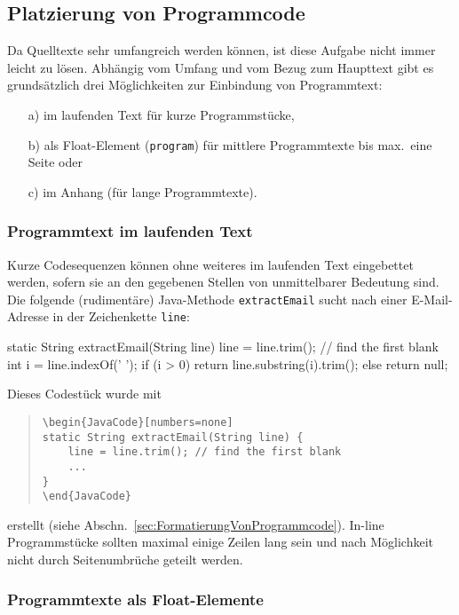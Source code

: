 \subsection{Platzierung von Programmcode}

Da Quelltexte sehr umfangreich werden können, ist diese Aufgabe nicht immer
leicht zu lösen. Abhängig vom Umfang und vom Bezug zum Haupttext gibt es
grundsätzlich drei Möglichkeiten zur Einbindung von Programmtext:
%
\begin{itemize}
	\item[a)] im laufenden Text für kurze Programmstücke,
	\item[b)] als Float-Element (\texttt{program}) für mittlere Programmtexte
	bis max.\ eine Seite oder
	\item[c)] im Anhang (für lange Programmtexte).
\end{itemize}

\subsubsection{Programmtext im laufenden Text}

Kurze Codesequenzen können ohne weiteres im laufenden Text eingebettet
werden, sofern sie an den gegebenen Stellen von unmittelbarer Bedeutung sind.
Die folgende (rudimentäre) Java-Methode \texttt{extractEmail} sucht nach
einer E-Mail-Adresse in der Zeichenkette \texttt{line}:
%
\begin{JavaCode}[numbers=none]
static String extractEmail(String line) {
    line = line.trim(); // find the first blank
    int i = line.indexOf(' '); 
    if (i > 0)
        return line.substring(i).trim();
    else
        return null;
}
\end{JavaCode}
%
\noindent
Dieses Codestück wurde mit 
%
\begin{quote}
\begin{verbatim}
\begin{JavaCode}[numbers=none]
static String extractEmail(String line) {
    line = line.trim(); // find the first blank
    ...
}
\end{JavaCode}
\end{verbatim}
\end{quote}
%
erstellt (siehe Abschn.\ \ref{sec:FormatierungVonProgrammcode}). In-line
Programmstücke sollten maximal einige Zeilen lang sein und nach Möglichkeit
nicht durch Seitenumbrüche geteilt werden.


\subsubsection{Programmtexte als Float-Elemente}

